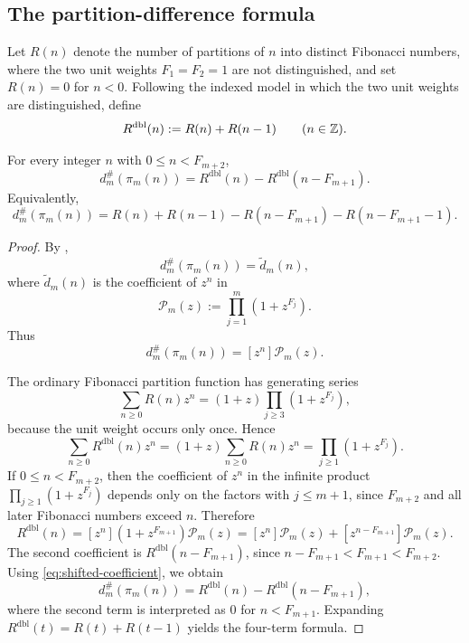 \subsection{The partition-difference formula}

\begin{definition}
\label{def:partition-functions}
Let \(R(n)\) denote the number of partitions of \(n\) into distinct Fibonacci
numbers, where the two unit weights \(F_1=F_2=1\) are not distinguished, and
set \(R(n)=0\) for \(n<0\).  Following the indexed model in which the two unit
weights are distinguished, define
\[
  R^{\mathrm{dbl}}(n):=R(n)+R(n-1)
  \qquad (n\in\mathbb{Z}).
\]
\end{definition}

\begin{theorem}
\label{thm:partition-difference}
For every integer \(n\) with \(0\le n<F_{m+2}\),
\[
  d_m^\#(\pi_m(n))
  =
  R^{\mathrm{dbl}}(n)-R^{\mathrm{dbl}}(n-F_{m+1}).
\]
Equivalently,
\[
  d_m^\#(\pi_m(n))
  =
  R(n)+R(n-1)-R(n-F_{m+1})-R(n-F_{m+1}-1).
\]
\end{theorem}

\begin{proof}
By ,
\[
  d_m^\#(\pi_m(n))=\widetilde d_m(n),
\]
where \(\widetilde d_m(n)\) is the coefficient of \(z^n\) in
\[
  \mathcal P_m(z):=\prod_{j=1}^m(1+z^{F_j}).
\]
Thus
\begin{equation}\label{eq:shifted-coefficient}
  d_m^\#(\pi_m(n))=[z^n]\mathcal P_m(z).
\end{equation}

The ordinary Fibonacci partition function has generating series
\[
  \sum_{n\ge 0}R(n)z^n=(1+z)\prod_{j\ge 3}(1+z^{F_j}),
\]
because the unit weight occurs only once.  Hence
\begin{equation}\label{eq:indexed-generating}
  \sum_{n\ge 0}R^{\mathrm{dbl}}(n)z^n
  =
  (1+z)\sum_{n\ge 0}R(n)z^n
  =
  \prod_{j\ge 1}(1+z^{F_j}).
\end{equation}
If \(0\le n<F_{m+2}\), then the coefficient of \(z^n\) in the infinite product
\(\prod_{j\ge 1}(1+z^{F_j})\) depends only on the factors with \(j\le m+1\),
since \(F_{m+2}\) and all later Fibonacci numbers exceed \(n\).  Therefore
\[
  R^{\mathrm{dbl}}(n)
  =
  [z^n](1+z^{F_{m+1}})\mathcal P_m(z)
  =
  [z^n]\mathcal P_m(z)+[z^{n-F_{m+1}}]\mathcal P_m(z).
\]
The second coefficient is \(R^{\mathrm{dbl}}(n-F_{m+1})\), since
\(n-F_{m+1}<F_{m+1}<F_{m+2}\).  Using \eqref{eq:shifted-coefficient}, we
obtain
\[
  d_m^\#(\pi_m(n))
  =
  R^{\mathrm{dbl}}(n)-R^{\mathrm{dbl}}(n-F_{m+1}),
\]
where the second term is interpreted as \(0\) for \(n<F_{m+1}\).  Expanding
\(R^{\mathrm{dbl}}(t)=R(t)+R(t-1)\) yields the four-term formula.
\end{proof}

